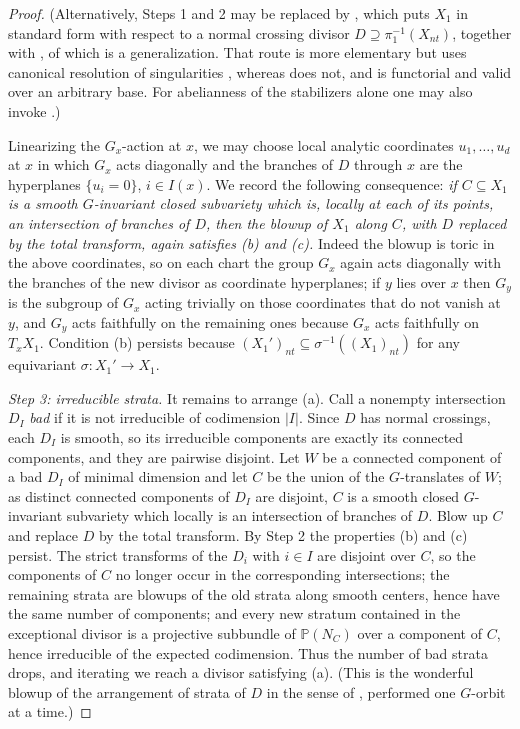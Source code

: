 \documentclass[11pt]{amsart}
\theoremstyle{plain}
\theoremstyle{definition}
\theoremstyle{remark}
\numberwithin{equation}{section}
\begin{document}
\begin{proof}
(Alternatively, Steps 1 and 2 may be replaced by
\cite[Corollary~3.6]{ReichsteinYoussin}, which puts $X_1$ in standard form
with respect to a normal crossing divisor $D \supseteq \pi_1^{-1}(X_{nt})$,
together with \cite[Theorem~4.1 and Remark~4.4]{ReichsteinYoussin}, of which
\cite[Theorem~C]{BerghRydh} is a generalization.  That route is more
elementary but uses canonical resolution of singularities
\cite{BierstoneMilman, Wlodarczyk, Kollar}, whereas
\cite[Theorem~A]{BerghRydh} does not, and is functorial and valid over an
arbitrary base.  For abelianness of the stabilizers alone one may also invoke
\cite{BorisovGunnells}.)

Linearizing the $G_x$-action at $x$, we may choose local analytic coordinates
$u_1, \ldots, u_d$ at $x$ in which $G_x$ acts diagonally and the branches of
$D$ through $x$ are the hyperplanes $\{u_i = 0\}$, $i \in I(x)$.  We record
the following consequence: \emph{if $C \subseteq X_1$ is a smooth
$G$-invariant closed subvariety which is, locally at each of its points, an
intersection of branches of $D$, then the blowup of $X_1$ along $C$, with $D$
replaced by the total transform, again satisfies (b) and (c).}  Indeed the
blowup is toric in the above coordinates, so on each chart the group $G_x$
again acts diagonally with the branches of the new divisor as coordinate
hyperplanes; if $y$ lies over $x$ then $G_y$ is the subgroup of $G_x$ acting
trivially on those coordinates that do not vanish at $y$, and $G_y$ acts
faithfully on the remaining ones because $G_x$ acts faithfully on
$T_xX_1$.  Condition (b) persists because
$(X_1')_{nt} \subseteq \sigma^{-1}((X_1)_{nt})$ for any equivariant
$\sigma : X_1' \to X_1$.

\emph{Step 3: irreducible strata.}
It remains to arrange (a).  Call a nonempty intersection $D_I$ \emph{bad} if
it is not irreducible of codimension $|I|$.  Since $D$ has normal crossings,
each $D_I$ is smooth, so its irreducible components are exactly its connected
components, and they are pairwise disjoint.  Let $W$ be a connected component
of a bad $D_I$ of minimal dimension and let $C$ be the union of the
$G$-translates of $W$; as distinct connected components of $D_I$ are
disjoint, $C$ is a smooth closed $G$-invariant subvariety which locally is an
intersection of branches of $D$.  Blow up $C$ and replace $D$ by the total
transform.  By Step 2 the properties (b) and (c) persist.  The strict
transforms of the $D_i$ with $i \in I$ are disjoint over $C$, so the
components of $C$ no longer occur in the corresponding intersections; the
remaining strata are blowups of the old strata along smooth centers, hence
have the same number of components; and every new stratum contained in the
exceptional divisor is a projective subbundle of $\mathbb{P}(N_{C})$ over a
component of $C$, hence irreducible of the expected codimension.  Thus the
number of bad strata drops, and iterating we reach a divisor satisfying (a).
(This is the wonderful blowup of the arrangement of strata of $D$ in the
sense of \cite{DeConciniProcesi, MacPhersonProcesi, LiLi}, performed one
$G$-orbit at a time.)


\end{proof}
\end{document}
